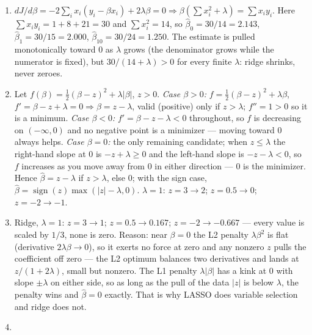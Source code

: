 \documentclass[
  11pt,
]{article}
\newcounter{none} %
\newcommand{\answerspace}[1]{\par\vspace*{#1}}  %
\begin{document}
\answerspace{2in}

\begin{solutionbox}

\begin{enumerate}
\def\labelenumi{(\alph{enumi})}
\item
  \(dJ/d\beta = -2\sum_i x_i(y_i - \beta x_i) + 2\lambda\beta = 0
  \Rightarrow \beta(\sum x_i^2 + \lambda) = \sum x_iy_i\). Here
  \(\sum x_iy_i = 1 + 8 + 21 = 30\) and \(\sum x_i^2 = 14\), so
  \(\hat\beta_0 = 30/14 = 2.143\), \(\hat\beta_1 = 30/15 = 2.000\),
  \(\hat\beta_{10} = 30/24 = 1.250\). The estimate is pulled
  monotonically toward \(0\) as \(\lambda\) grows (the denominator grows
  while the numerator is fixed), but \(30/(14+\lambda) > 0\) for every
  finite \(\lambda\): ridge shrinks, never zeroes.
\item
  Let \(f(\beta) = \tfrac12(\beta-z)^2 + \lambda|\beta|\), \(z > 0\).
  \emph{Case \(\beta>0\):} \(f = \tfrac12(\beta-z)^2 + \lambda\beta\),
  \(f' = \beta - z + \lambda = 0
  \Rightarrow \beta = z - \lambda\), valid (positive) only if
  \(z > \lambda\); \(f''=1>0\) so it is a minimum. \emph{Case
  \(\beta<0\):} \(f' = \beta - z - \lambda < 0\) throughout, so \(f\) is
  decreasing on \((-\infty,0)\) and no negative point is a minimizer ---
  moving toward \(0\) always helps. \emph{Case \(\beta = 0\):} the only
  remaining candidate; when \(z \le \lambda\) the right-hand slope at
  \(0\) is \(-z + \lambda \ge 0\) and the left-hand slope is
  \(-z-\lambda < 0\), so \(f\) increases as you move away from \(0\) in
  either direction --- \(0\) is the minimizer. Hence
  \(\hat\beta = z-\lambda\) if \(z>\lambda\), else \(0\); with the sign
  case, \(\hat\beta = \operatorname{sign}(z)\max(|z|-\lambda,0)\).
  \(\lambda=1\): \(z=3 \to 2\); \(z=0.5 \to 0\); \(z=-2 \to -1\).
\item
  Ridge, \(\lambda = 1\): \(z=3\to1\); \(z=0.5\to0.167\);
  \(z=-2\to-0.667\) --- every value is scaled by \(1/3\), none is zero.
  Reason: near \(\beta=0\) the L2 penalty \(\lambda\beta^2\) is flat
  (derivative \(2\lambda\beta \to 0\)), so it exerts no force at zero
  and any nonzero \(z\) pulls the coefficient off zero --- the L2
  optimum balances two derivatives and lands at \(z/(1+2\lambda)\),
  small but nonzero. The L1 penalty \(\lambda|\beta|\) has a kink at
  \(0\) with slope \(\pm\lambda\) on either side, so as long as the pull
  of the data \(|z|\) is below \(\lambda\), the penalty wins and
  \(\hat\beta = 0\) exactly. That is why LASSO does variable selection
  and ridge does not.
\item

\end{enumerate}
\end{solutionbox}
\end{document}
